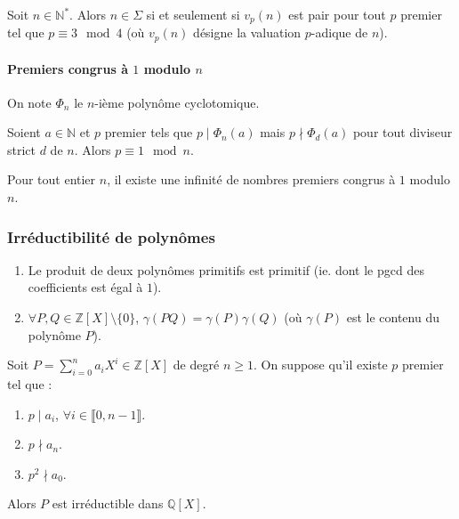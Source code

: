 	\begin{theorem}
		Soit $n \in \mathbb{N}^*$. Alors $n \in \Sigma$ si et seulement si $v_p(n)$ est pair pour tout $p$ premier tel que $p \equiv 3 \mod 4$ (où $v_p(n)$ désigne la valuation $p$-adique de $n$).
	\end{theorem}

	\paragraph{Premiers congrus à \texorpdfstring{$1$}{1} modulo \texorpdfstring{$n$}{n}}


	\begin{notation}
		On note $\Phi_n$ le $n$-ième polynôme cyclotomique.
	\end{notation}

	\begin{lemma}
		Soient $a \in \mathbb{N}$ et $p$ premier tels que $p \mid \Phi_n(a)$ mais $p \nmid \Phi_d(a)$ pour tout diviseur strict $d$ de $n$. Alors $p \equiv 1 \mod n$.
	\end{lemma}


	\begin{theorem}
		Pour tout entier $n$, il existe une infinité de nombres premiers congrus à $1$ modulo $n$.
	\end{theorem}

	\subsubsection{Irréductibilité de polynômes}


	\begin{lemma}[Gauss]
		\begin{enumerate}[label=(\roman*)]
			\item Le produit de deux polynômes primitifs est primitif (ie. dont le pgcd des coefficients est égal à $1$).
			\item $\forall P, Q \in \mathbb{Z}[X] \setminus \{ 0 \}$, $\gamma(PQ) = \gamma(P) \gamma(Q)$ (où $\gamma(P)$ est le contenu du polynôme $P$).
		\end{enumerate}
	\end{lemma}


	\begin{theorem}
		Soit $P = \sum_{i=0}^n a_i X^i \in \mathbb{Z}[X]$ de degré $n \geq 1$. On suppose qu'il existe $p$ premier tel que :
		\begin{enumerate}[label=(\roman*)]
			\item $p \mid a_i$, $\forall i \in \llbracket 0, n-1 \rrbracket$.
			\item $p \nmid a_n$.
			\item $p^2 \nmid a_0$.
		\end{enumerate}
		Alors $P$ est irréductible dans $\mathbb{Q}[X]$.
	\end{theorem}

